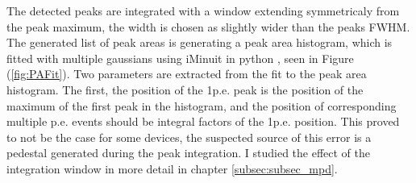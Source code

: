 \documentclass[12pt,article,type=msc,colorback,accentcolor=tud9c]{tudthesis}
\begin{document}
The detected peaks are integrated with a window extending symmetricaly from the peak maximum, the width is chosen as slightly wider than the peaks FWHM. The generated list of peak areas is generating a peak area histogram, which is fitted with multiple gaussians using iMinuit in python , seen in Figure (\ref{fig:PAFit}). Two parameters are extracted from the fit to the peak area histogram. The first, the position of the 1p.e. peak is the position of the maximum of the first peak in the histogram, and the position of corresponding multiple p.e. events should be integral factors of the 1p.e. position. This proved to not be the case for some devices, the suspected source of this error is a pedestal generated during the peak integration. I studied the effect of the integration window in more detail in chapter \ref{subsec:subsec_mpd}.\\
\end{document}
